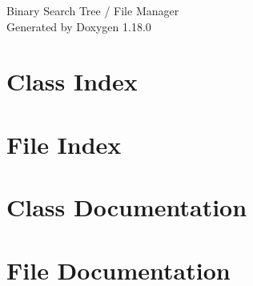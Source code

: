 \documentclass[twoside]{book}
\newcommand{\+}{\discretionary{\mbox{\scriptsize$\hookleftarrow$}}{}{}}
\newcommand{\clearemptydoublepage}{%
    \newpage{\pagestyle{empty}\cleardoublepage}%
  }
\begin{document}
  \raggedbottom
  \begin{titlepage}
  \vspace*{7cm}
  \begin{center}%
  {\Large Binary Search Tree /\+ File Manager}\\
  \vspace*{1cm}
  {\large Generated by Doxygen 1.18.0}\\
  \end{center}
  \end{titlepage}
  \clearemptydoublepage
  \tableofcontents
  \clearemptydoublepage
\chapter{Class Index}

\chapter{File Index}

\chapter{Class Documentation}



\chapter{File Documentation}










  \backmatter
  \newpage
  \clearemptydoublepage
  \printindex
\end{document}
